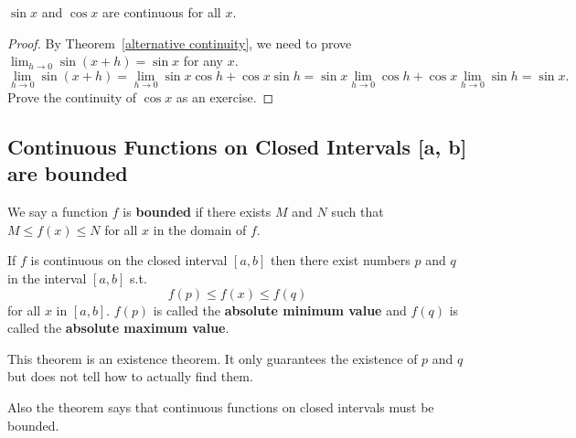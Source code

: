 \documentclass[../main.tex]{subfiles}
\begin{document}
\begin{theorem}
	$\sin x$ and $\cos x$ are continuous for all $x$.
\end{theorem}
\begin{proof}
	By Theorem~\ref{alternative continuity}, we need to prove $\lim_{h \to 0} \sin (x+h) = \sin x$ for any $x$.
	\[
		\lim_{h \to 0} \sin(x+h) =
		\lim_{h \to 0} \sin x \cos h + \cos x \sin h =
		\sin x \lim_{h \to 0} \cos h + \cos x \lim_{h \to 0} \sin h = \sin x.
	\]
	Prove the continuity of $\cos x$ as an exercise.
\end{proof}
\subsection*{Continuous Functions on Closed Intervals [a, b] are bounded}
We say a function $f$ is \textbf{bounded} if there exists $M$ and $N$ such that $M \le f(x) \le N$ for all $x$ in the domain of $f$.

\begin{theorem}
	If $f$ is continuous on the closed interval $[a, b]$ then there exist numbers $p$ and $q$ in the interval $[a,b]$ s.t.
	\[
		f(p) \leq f(x) \leq f(q)
	\]
	for all $x$ in $[a, b]$.
	$f(p)$ is called the \textbf{absolute minimum value} and $f(q)$ is called the \textbf{absolute maximum value}.
\end{theorem}

This theorem is an existence theorem. It only guarantees the existence of $p$ and $q$ but does not tell how to actually find them.

Also the theorem says that continuous functions on closed intervals must be bounded.
\end{document}
